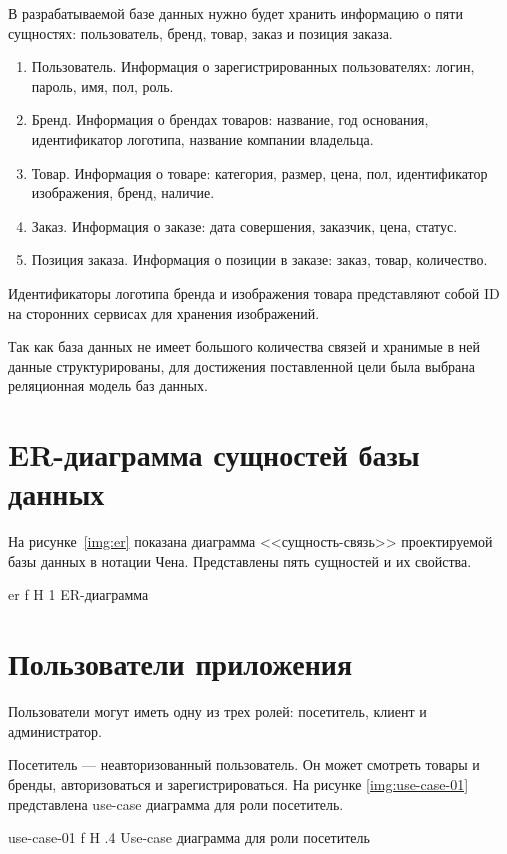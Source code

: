 \documentclass{bmstu}
\begin{document}
В разрабатываемой базе данных нужно будет хранить информацию о пяти сущностях: пользователь, бренд, товар, заказ и позиция заказа.
\begin{enumerate}
\item Пользователь. 
Информация о зарегистрированных пользователях: логин, пароль, имя, пол, роль.
\item Бренд. 
Информация о брендах товаров: название, год основания, идентификатор логотипа, название компании владельца.
\item Товар. 
Информация о товаре: категория, размер, цена, пол, идентификатор изображения, бренд, наличие.
\item Заказ.
Информация о заказе: дата совершения, заказчик, цена, статус.
\item Позиция заказа.
Информация о позиции в заказе: заказ, товар, количество.
\end{enumerate}

Идентификаторы логотипа бренда и изображения товара представляют собой ID на сторонних сервисах для хранения изображений.

Так как база данных не имеет большого количества связей и хранимые в ней данные структурированы, для достижения поставленной цели была выбрана реляционная модель баз данных.

\section{ER-диаграмма сущностей базы данных}

На рисунке~\ref{img:er} показана диаграмма <<сущность-связь>> проектируемой базы данных в нотации Чена. 
Представлены пять сущностей и их свойства.

    {er}
    {f}
    {H}
    {1\textwidth}
    {ER-диаграмма}
    
\section{Пользователи приложения}

Пользователи могут иметь одну из трех ролей: посетитель, клиент и администратор.

Посетитель --- неавторизованный пользователь. 
Он может смотреть товары и бренды, авторизоваться и зарегистрироваться. На рисунке \ref{img:use-case-01} представлена use-case диаграмма для роли посетитель.

{use-case-01}
{f}
{H}
{.4\textwidth}
{Use-case диаграмма для роли посетитель}
\end{document}
